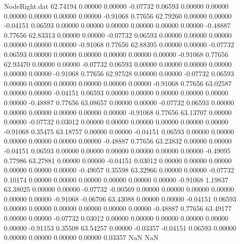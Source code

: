 \begin{filecontents}{NodeRight.dat}
  62.74194    0.00000    0.00000    -0.07732    0.06593    0.00000    0.00000    0.00000    0.00000    0.00000    0.00000   -0.91068    0.77656
  62.79260    0.00000    0.00000    -0.04151    0.06593    0.00000    0.00000    0.00000    0.00000    0.00000    0.00000   -0.48887    0.77656
  62.83313    0.00000    0.00000    -0.07732    0.06593    0.00000    0.00000    0.00000    0.00000    0.00000    0.00000   -0.91068    0.77656
  62.88395    0.00000    0.00000    -0.07732    0.06593    0.00000    0.00000    0.00000    0.00000    0.00000    0.00000   -0.91068    0.77656
  62.93470    0.00000    0.00000    -0.07732    0.06593    0.00000    0.00000    0.00000    0.00000    0.00000    0.00000   -0.91068    0.77656
  62.97528    0.00000    0.00000    -0.07732    0.06593    0.00000    0.00000    0.00000    0.00000    0.00000    0.00000   -0.91068    0.77656
  63.02587    0.00000    0.00000    -0.04151    0.06593    0.00000    0.00000    0.00000    0.00000    0.00000    0.00000   -0.48887    0.77656
  63.08657    0.00000    0.00000    -0.07732    0.06593    0.00000    0.00000    0.00000    0.00000    0.00000    0.00000   -0.91068    0.77656
  63.13707    0.00000    0.00000    -0.07732    0.03012    0.00000    0.00000    0.00000    0.00000    0.00000    0.00000   -0.91068    0.35475
  63.18757    0.00000    0.00000    -0.04151    0.06593    0.00000    0.00000    0.00000    0.00000    0.00000    0.00000   -0.48887    0.77656
  63.23832    0.00000    0.00000    -0.04151    0.06593    0.00000    0.00000    0.00000    0.00000    0.00000    0.00000   -0.49095    0.77986
  63.27881    0.00000    0.00000    -0.04151    0.03012    0.00000    0.00000    0.00000    0.00000    0.00000    0.00000   -0.49057    0.35598
  63.32966    0.00000    0.00000    -0.07732    0.10174    0.00000    0.00000    0.00000    0.00000    0.00000    0.00000   -0.91068    1.19837
  63.38025    0.00000    0.00000    -0.07732   -0.00569    0.00000    0.00000    0.00000    0.00000    0.00000    0.00000   -0.91068   -0.06706
  63.43088    0.00000    0.00000    -0.04151    0.06593    0.00000    0.00000    0.00000    0.00000    0.00000    0.00000   -0.48887    0.77656
  63.49177    0.00000    0.00000    -0.07732    0.03012    0.00000    0.00000    0.00000    0.00000    0.00000    0.00000   -0.91153    0.35508
  63.54257    0.00000   -0.03357    -0.04151    0.06593    0.00000    0.00000    0.00000    0.00000    0.00000    0.03357        NaN        NaN
\end{filecontents}
